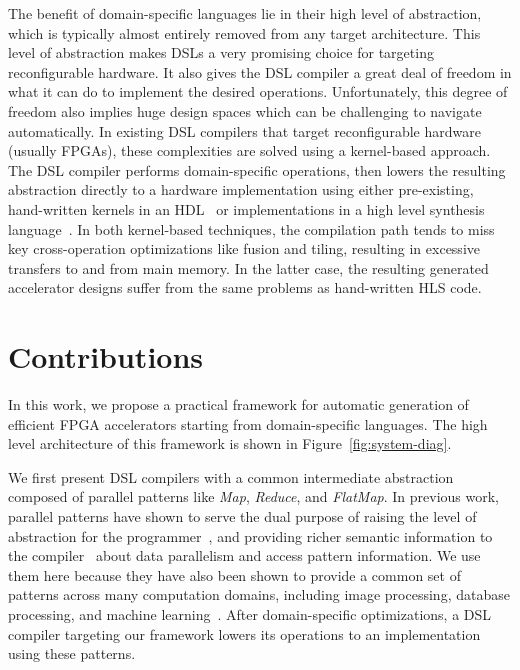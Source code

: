 The benefit of domain-specific languages lie in their
high level of abstraction, which is typically almost entirely removed from any target
architecture. This level of abstraction makes DSLs a very promising choice for targeting reconfigurable
hardware.
It also gives the DSL compiler a great deal of freedom in what it can do to implement the
desired operations. Unfortunately, this degree of freedom also implies huge design spaces
which can be challenging to navigate automatically.
In existing DSL compilers that target reconfigurable hardware (usually FPGAs),
these complexities are solved using a kernel-based approach.
The DSL compiler performs domain-specific operations, then lowers the resulting
abstraction directly to a hardware implementation using either pre-existing, hand-written kernels in
an HDL~\cite{TODO} or implementations in a high level synthesis language~\cite{george14fpl}.
In both kernel-based techniques, the compilation path tends to miss key cross-operation optimizations
like fusion and tiling, resulting in excessive transfers to and from main memory.
In the latter case, the resulting generated accelerator designs suffer from the
same problems as hand-written HLS code.

\section{Contributions}
In this work, we propose a practical framework for automatic generation of
efficient FPGA accelerators starting from domain-specific languages.
The high level architecture of this framework is shown in Figure~\ref{fig:system-diag}.

We first present DSL compilers with a common intermediate abstraction composed of
parallel patterns like \emph{Map}, \emph{Reduce}, and \emph{FlatMap}.
In previous work, parallel patterns have shown to serve the dual purpose of raising the
level of abstraction for the
programmer~\cite{ecoop13sujeeth,pldi13halide}, and providing richer
semantic information to the compiler~\cite{delite-tecs14} about data parallelism
and access pattern information. We use them here because they have also been shown
to provide a common set of patterns across many computation domains, including
image processing, database processing, and machine learning~\cite{pldi13halide,ecoop13sujeeth}.
After domain-specific optimizations, a DSL compiler targeting
our framework lowers its operations to an implementation using these patterns.

